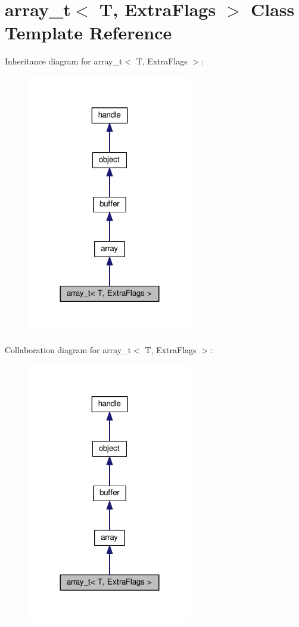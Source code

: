 \hypertarget{classarray__t}{}\section{array\+\_\+t$<$ T, Extra\+Flags $>$ Class Template Reference}
\label{classarray__t}


Inheritance diagram for array\+\_\+t$<$ T, Extra\+Flags $>$\+:
\nopagebreak
\begin{figure}[H]
\begin{center}
\leavevmode
\includegraphics[width=204pt]{classarray__t__inherit__graph}
\end{center}
\end{figure}


Collaboration diagram for array\+\_\+t$<$ T, Extra\+Flags $>$\+:
\nopagebreak
\begin{figure}[H]
\begin{center}
\leavevmode
\includegraphics[width=204pt]{classarray__t__coll__graph}
\end{center}
\end{figure}
